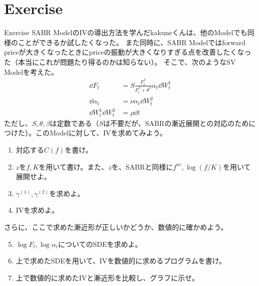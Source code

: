 \documentclass[dvipdfmx,9pt]{beamer}
\begin{document}
\section{Exercise}
\begin{frame}{Exercise}
  SABR ModelのIVの導出方法を学んだkakuneくんは、他のModelでも同様のことができるか試したくなった。
  また同時に、SABR Modelではforward priceが大きくなったときにpriceの振動が大きくなりすぎる点を改善したくなった（本当にこれが問題たり得るのかは知らない）。
  そこで、次のようなSV Modelを考えた。
  \begin{align}
    \dd F_{t}                   & = S\frac{F_{t}^{\beta}}{F_{t}^{\beta} + \theta^{\beta}} \alpha_{t} \dd W_{t}^{1} \\
    \dd \alpha_{t}              & = \nu \alpha_{t} \dd W_{t}^{2}                                                   \\
    \dd W_{t}^{1} \dd W_{t}^{2} & = \rho \dd t
  \end{align}
  ただし、$S,\theta,\beta$は定数である（$S$は不要だが、SABRの漸近展開との対応のためにつけた）。このModelに対して、IVを求めてみよう。
  \begin{enumerate}
    \item 対応する$C(f)$を書け。
    \item $z$を$f,K$を用いて書け。また、$z$を、SABRと同様に$f^{av},\log (f/K)$を用いて展開せよ。
    \item $\gamma^{(1)},\gamma^{(2)}$を求めよ。
    \item IVを求めよ。
  \end{enumerate}
  さらに、ここで求めた漸近形が正しいかどうか、数値的に確かめよう。
  \begin{enumerate}
    \setcounter{enumi}{4}
    \item $\log F_{t} , \log \alpha_{t}$についてのSDEを求めよ。
    \item 上で求めたSDEを用いて、IVを数値的に求めるプログラムを書け。
    \item 上で数値的に求めたIVと漸近形を比較し、グラフに示せ。
  \end{enumerate}

\end{frame}
\end{document}
